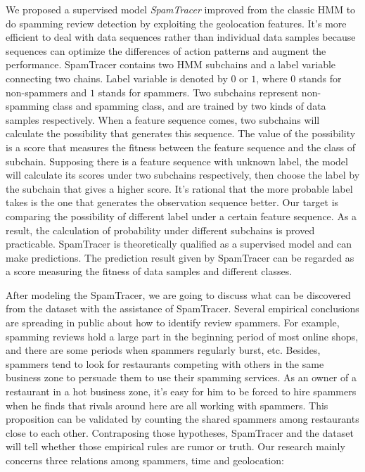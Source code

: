 \begin{bigabstract}
We proposed a supervised model \emph{SpamTracer} improved from the classic HMM to do spamming review detection by exploiting the geolocation features. It's more efficient to deal with data sequences rather than individual data samples because sequences can optimize the differences of action patterns and augment the performance. SpamTracer contains two HMM subchains and a label variable connecting two chains. Label variable is denoted by $0$ or $1$, where $0$ stands for non-spammers and $1$ stands for spammers. Two subchains represent non-spamming class and spamming class, and are trained by two kinds of data samples respectively. When a feature sequence comes, two subchains will calculate the possibility that generates this sequence. The value of the possibility is a score that measures the fitness between the feature sequence and the class of subchain. Supposing there is a feature sequence with unknown label, the model will calculate its scores under two subchains respectively, then choose the label by the subchain that gives a higher score. It's rational that the more probable label takes is the one that generates the observation sequence better. Our target is comparing the possibility of different label under a certain feature sequence. As a result, the calculation of probability under different subchains is proved practicable. SpamTracer is theoretically qualified as a supervised model and can make predictions. The prediction result given by SpamTracer can be regarded as a score measuring the fitness of data samples and different classes. 

After modeling the SpamTracer, we are going to discuss what can be discovered from the dataset with the assistance of SpamTracer. Several empirical conclusions are spreading in public about how to identify review spammers. For example, spamming reviews hold a large part in the beginning period of most online shops, and there are some periods when spammers regularly burst, etc. Besides, spammers tend to look for restaurants competing with others in the same business zone to persuade them to use their spamming services. As an owner of a restaurant in a hot business zone, it's easy for him to be forced to hire spammers when he finds that rivals around here are all working with spammers. This proposition can be validated by counting the shared spammers among restaurants close to each other. Contraposing those hypotheses, SpamTracer and the dataset will tell whether those empirical rules are rumor or truth. Our research mainly concerns three relations among spammers, time and geolocation:


\end{bigabstract}
